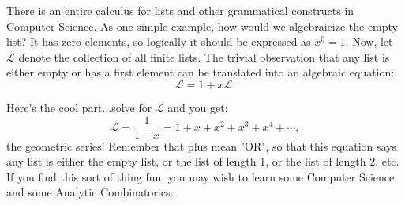 \documentclass[twoside,openright,titlepage,a4paper]{book}
\begin{document}
\begin{sloppypar}
There is an entire calculus for lists and other grammatical constructs in Computer Science. As one simple example, how would we algebraicize the empty list? It has zero elements, so logically it should be expressed as $x^0 = 1$. Now, let $\mathcal{L}$ denote the collection of all finite lists. The trivial observation that any list is either empty or has a first element can be translated into an algebraic equation: 
\[ \mathcal{L} = 1 + x \mathcal{L}. \]

Here's the cool part...solve for $\mathcal{L}$ and you get:
\[ \mathcal{L} = \frac{1}{1-x} = 1 + x + x^2 + x^3 + x^4 + \dotsb, \]
the geometric series! Remember that plus mean "OR", so that this equation says any list is either the empty list, or the list of length 1, or the list of length 2, etc. If you find this sort of thing fun, you may wish to learn some Computer Science and some Analytic Combinatorics.


\end{sloppypar}
\end{document}

